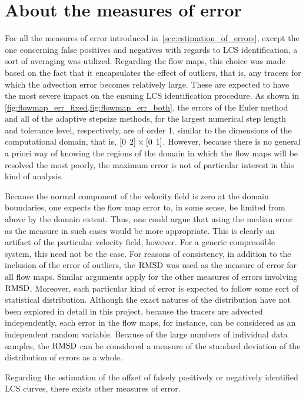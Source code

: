 \section{About the measures of error}
\label{sec:about_the_measures_of_error}

For all the measures of error introduced in~\cref{sec:estimation_of_errors},
except the one concerning false positives and negatives with regards to
LCS identification, a sort of averaging was utilized. Regarding the flow maps,
this choice was made based on the fact that it encapsulates the effect of
outliers, that is, any tracers for which the advection error becomes
relatively large. These are expected to have the most severe impact on the
ensuing LCS identification procedure. As shown in
\cref{fig:flowmap_err_fixed,fig:flowmap_err_both}, the errors of the Euler
method and all of the adaptive stepsize methods, for the largest numerical step
length and tolerance level, respectively, are of order 1, similar to the
dimensions of the computational domain, that is,
$[0\hspace{1ex}2]\times[0\hspace{1ex}1]$. However, because there is no general
a priori way of knowing the regions of the domain in which the flow maps will be
resolved the most poorly, the maximum error is not of particular interest
in this kind of analysis.

Because the normal component of the velocity field is zero at the domain
boundaries, one expects the flow map error to, in some sense, be limited from
above by the domain extent. Thus, one could argue that using the median error
as the measure in such cases would be more appropriate. This is clearly an
artifact of the particular velocity field, however. For a generic compressible
system, this need not be the case. For reasons of consistency, in addition to
the inclusion of the error of outliers, the $\operatorname{RMSD}$ was used as the measure of
error for all flow maps. Similar arguments apply for the other measures
of errors involving $\operatorname{RMSD}$. Moreover, each particular kind of error
is expected to follow some sort of statistical distribution. Although the
exact natures of the distribution have not been explored in detail in this
project, because the tracers are advected independently, each error in
the flow maps, for instance, can be considered as an independent
random variable. Because of the large numbers of individual data samples,
the $\operatorname{RMSD}$ can be considered a measure of the standard deviation of the
distribution of errors as a whole.

Regarding the estimation of the offset of falsely positively or negatively
identified LCS curves, there exists other measures of error.
